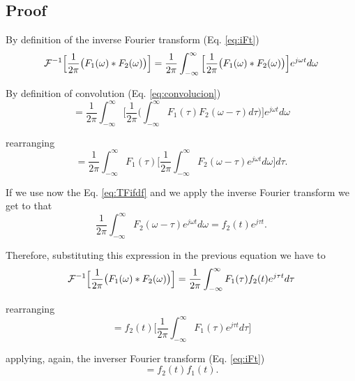 \subsection*{Proof}
By definition of the inverse Fourier transform (Eq. \ref{eq:iFt})
\begin{equation*}
  {\cal F}^{-1}\Big[\displaystyle\frac{1}{2\pi}\big(F_1(\omega)*F_2(\omega)\big)\Big] =
  \displaystyle\frac{1}{2\pi}\displaystyle\int_{-\infty}^\infty
  \Big[\frac{1}{2\pi}\big(F_1(\omega)*F_2(\omega)\big)\Big]e^{j\omega t}d\omega
\end{equation*}

By definition of convolution (Eq. \ref{eq:convolucion})
\begin{equation*}
=
  \displaystyle\frac{1}{2\pi}\displaystyle\int_{-\infty}^\infty
  \Big[\frac{1}{2\pi}\big(\displaystyle\int_{-\infty}^\infty
    F_1(\tau)F_2(\omega-\tau)d\tau\big)\Big]e^{j\omega t}d\omega
\end{equation*}

rearranging
\begin{equation*}
=
  \displaystyle\frac{1}{2\pi}\displaystyle\int_{-\infty}^\infty
  F_1(\tau)\Big[\frac{1}{2\pi}\displaystyle\int_{-\infty}^\infty
  F_2(\omega-\tau)e^{j\omega t}d\omega\Big]d\tau.
\end{equation*}

If we use now the Eq. \ref{eq:TFifdf} and we apply the inverse Fourier
transform we get to that
\begin{equation*}
  \frac{1}{2\pi}\int_{-\infty}^\infty F_2(\omega-\tau)e^{j\omega t}d\omega = f_2(t)e^{j\tau t}.
\end{equation*}

Therefore, substituting this expression in the previous equation we have to
\begin{equation*}
  {\cal F}^{-1}\Big[\displaystyle\frac{1}{2\pi}\big(F_1(\omega)*F_2(\omega)\big)\Big] = 
  \displaystyle\frac{1}{2\pi}\displaystyle\int_{-\infty}^\infty
  F_1(\tau)f_2(t)e^{j\tau t}d\tau
\end{equation*}

rearranging
\begin{equation*}
= f_2(t)\Big[\displaystyle\frac{1}{2\pi}\displaystyle\int_{-\infty}^\infty
  F_1(\tau)e^{j\tau t}d\tau\Big]
\end{equation*}

applying, again, the inverser Fourier transform (Eq. \ref{eq:iFt})
\begin{equation*}
= f_2(t)f_1(t).
\end{equation*}

